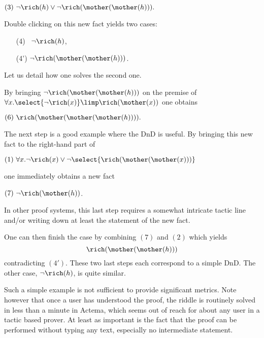 \medskip
$(3) ~\neg\rich(h)\lor \neg\rich(\mother(\mother(h))).$
\medskip

\noindent Double clicking on this new fact yields two cases:
\begin{itemize}
 \item[(4)~] $ \neg\rich(h)$,
 \item[(4')] $ \neg\rich(\mother(\mother(h)))$.
 \end{itemize}
Let us detail how one solves the
second one.

By bringing 
$\neg\rich(\mother(\mother(h)))$ on the premise of $\forall
x. \select{\neg\rich(x)} \limp \rich(\mother(x))$
one obtains

\medskip
$(6) ~\rich(\mother(\mother(\mother(h)))).$
\medskip

The next step is a good example where the DnD is useful. By bringing
this new fact to the right-hand part of

\medskip
$(1)~\forall x. \neg\rich(x)\lor \neg\select{\rich(\mother(\mother(x)))}$
\medskip

\noindent
one immediately obtains a new fact

\medskip
$(7) ~\neg{\rich(\mother(h))}$.
\medskip

\noindent In other proof systems, this last step requires a somewhat intricate
tactic line and/or writing down at least the statement of the new fact.

One can then finish the case by combining $(7)$ and $(2)$ which yields
$$\rich(\mother(\mother(h)))$$ contradicting $(4')$. These two last steps each
correspond to a simple DnD. The other case, $\neg\rich(h)$, is quite similar.

Such a simple example is not sufficient to provide significant
metrics. Note however that once a user has understood the proof, the
riddle is routinely solved in less than a minute in Actema, which
seems out of reach for about any user in a tactic based prover. At
least as important is the fact that the proof can be performed without
typing any text, especially no intermediate statement. 
